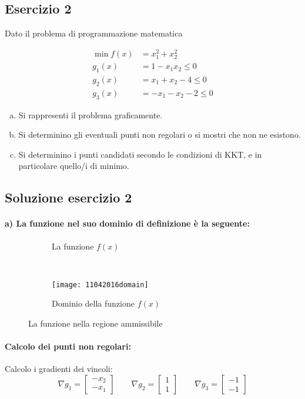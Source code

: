 \documentclass[\main/main.tex]{subfiles}
\begin{document}
\subsection{Esercizio 2}
Dato il problema di programmazione matematica

\begin{align*}
  \min f(x) & =x^2_1+x^2_2           \\
  g_1(x)    & = 1-x_1x_2 \leq 0      \\
  g_2(x)    & = x_1 + x_2 -4 \leq 0  \\
  g_3(x)    & = -x_1 - x_2 - 2\leq 0
\end{align*}

\begin{enumerate}[a)]
  \item Si rappresenti il problema graficamente.
  \item Si determinino gli eventuali punti non regolari o si mostri che non ne esistono.
  \item Si determinino i punti candidati secondo le condizioni di KKT, e in particolare quello/i di minimo.
\end{enumerate}

\subsection{Soluzione esercizio 2}

\paragraph*{a) La funzione nel suo dominio di definizione è la seguente:}

\begin{figure}
  \begin{subfigure}{0.45\textwidth}
    \caption{La funzione $f(x)$}
  \end{subfigure}
  ~
  \begin{subfigure}{0.45\textwidth}
    \texttt{[image: 11042016domain]}
    \caption{Dominio della funzione $f(x)$}
  \end{subfigure}
  \caption{La funzione nella regione ammissibile}
\end{figure}

\paragraph*{Calcolo dei punti non regolari:}
Calcolo i gradienti dei vincoli:
\[
  \nabla g_1 = \begin{bmatrix}
    -x_2 \\
    -x_1
  \end{bmatrix}
  \qquad
  \nabla g_2 = \begin{bmatrix}
    1 \\
    1
  \end{bmatrix}
  \qquad
  \nabla g_3 = \begin{bmatrix}
    -1 \\
    -1
  \end{bmatrix}
\]
\end{document}
